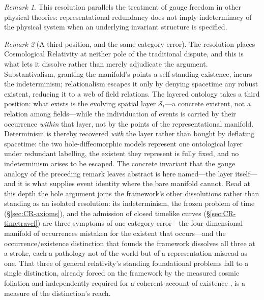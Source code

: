 \documentclass[11pt,a4paper]{article}
\theoremstyle{plain}
\theoremstyle{definition}
\theoremstyle{remark}
\newtheorem{remark}{Remark}
\begin{document}
\begin{remark}
This resolution parallels the treatment of gauge freedom in other physical theories: representational redundancy does not imply indeterminacy of the physical system when an underlying invariant structure is specified.
\end{remark}

\begin{remark}[A third position, and the same category error]
The resolution places Cosmological Relativity at neither pole of the traditional dispute, and this is what lets it dissolve rather than merely adjudicate the argument. Substantivalism, granting the manifold's points a self-standing existence, incurs the indeterminism; relationalism escapes it only by denying spacetime any robust existent, reducing it to a web of field relations. The layered ontology takes a third position: what exists is the evolving spatial layer $\mathcal{S}_t$---a concrete existent, not a relation among fields---while the individuation of events is carried by their occurrence \emph{within} that layer, not by the points of the representational manifold. Determinism is thereby recovered \emph{with} the layer rather than bought by deflating spacetime: the two hole-diffeomorphic models represent one ontological layer under redundant labelling, the existent they represent is fully fixed, and no indeterminism arises to be escaped. The concrete invariant that the gauge analogy of the preceding remark leaves abstract is here named---the layer itself---and it is what supplies event identity where the bare manifold cannot. Read at this depth the hole argument joins the framework's other dissolutions rather than standing as an isolated resolution: its indeterminism, the frozen problem of time (\S\ref{sec:CR-axioms}), and the admission of closed timelike curves (\S\ref{sec:CR-timetravel}) are three symptoms of one category error---the four-dimensional manifold of occurrences mistaken for the existent that occurs---and the occurrence/existence distinction that founds the framework dissolves all three at a stroke, each a pathology not of the world but of a representation misread as one. That three of general relativity's standing foundational problems fall to a single distinction, already forced on the framework by the measured cosmic foliation \cite{JanzenModernParallax} and independently required for a coherent account of existence \cite{JanzenShadowExistence}, is a measure of the distinction's reach.
\end{remark}
\end{document}
